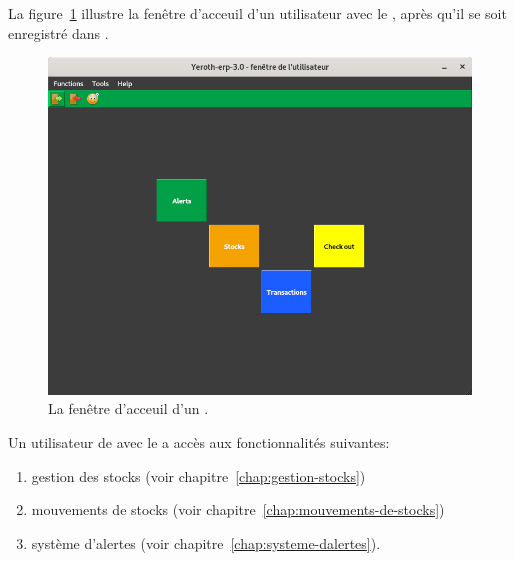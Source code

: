 \label{sec:utilisateurs-lemagasinier}

La figure~\ref{fig:yeren-fenetre-magasinier} illustre
la fen\^etre d'acceuil d'un utilisateur avec le
\role \magasinier, apr\`es qu'il se soit enregistr\'e
dans \yeroth.\\

\begin{figure}[!htbp]
\centering
\includegraphics[scale=0.63]{images/yeren-fenetre-magasinier.png}
\caption{La fen\^etre d'acceuil d'un \magasinier.}
\label{fig:yeren-fenetre-magasinier}
\end{figure}

Un utilisateur de \yeroth avec le \role \magasinier a acc\`es
aux fonctionnalit\'es suivantes:

\begin{enumerate}[1)]
	\item gestion des stocks (voir chapitre~\ref{chap:gestion-stocks})
	\item mouvements de stocks (voir chapitre~\ref{chap:mouvements-de-stocks})	
	\item syst\`eme d'alertes (voir chapitre~\ref{chap:systeme-dalertes}).\\
\end{enumerate}
